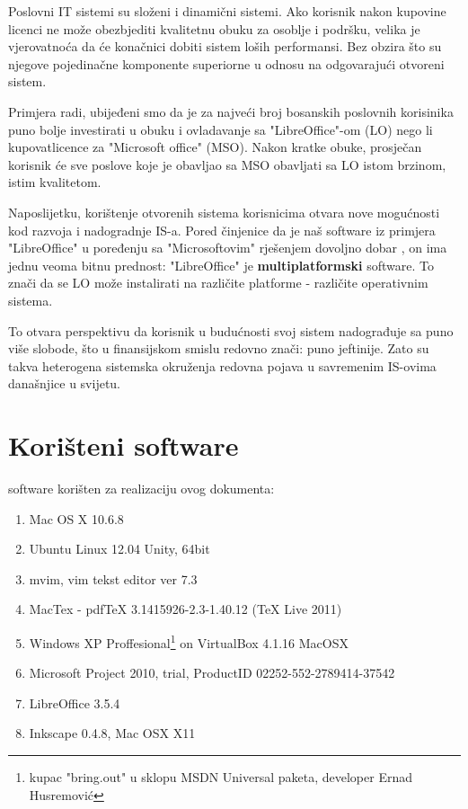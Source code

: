 \documentclass[times, utf8, seminar]{fit}
\begin{document}
Poslovni IT sistemi su složeni i dinamični sistemi. Ako korisnik nakon kupovine licenci ne može obezbjediti kvalitetnu obuku za osoblje i podršku, velika je vjerovatnoća da će konačnici dobiti sistem loših performansi. Bez obzira što su njegove pojedinačne komponente superiorne u odnosu na odgovarajući otvoreni sistem.

Primjera radi, ubijeđeni smo da je za najveći broj bosanskih poslovnih korisinika puno bolje investirati u obuku i ovladavanje sa "LibreOffice"-om (LO) nego li kupovatlicence za "Microsoft office" (MSO). Nakon kratke obuke, prosječan korisnik će sve poslove koje je obavljao sa MSO obavljati sa LO istom brzinom, istim kvalitetom.

Naposlijetku, korištenje otvorenih sistema korisnicima otvara nove mogućnosti kod razvoja i nadogradnje IS-a. 
Pored činjenice da je naš software iz primjera "LibreOffice" u poređenju sa "Microsoftovim" rješenjem dovoljno dobar , on ima jednu veoma bitnu prednost: "LibreOffice" je \textbf{multiplatformski} software. To znači da se LO može instalirati na različite platforme - različite operativnim sistema.

To otvara perspektivu da korisnik u budućnosti svoj sistem nadograđuje sa puno više slobode, što u finansijskom smislu redovno znači: puno jeftinije. Zato su takva heterogena sistemska okruženja redovna pojava u savremenim IS-ovima današnjice u svijetu.  




\appendix

\chapter{Korišteni software}
software korišten za realizaciju ovog dokumenta:
\begin{enumerate}
  \item Mac OS X 10.6.8
  \item Ubuntu Linux 12.04 Unity, 64bit
  \item mvim, vim tekst editor ver 7.3
  \item MacTex - pdfTeX 3.1415926-2.3-1.40.12 (TeX Live 2011)
  \item Windows XP Proffesional\footnote{kupac "bring.out" u sklopu MSDN Universal paketa, developer Ernad Husremović} on VirtualBox 4.1.16 MacOSX 
  \item Microsoft Project 2010, trial, ProductID 02252-552-2789414-37542
  \item LibreOffice 3.5.4
  \item Inkscape 0.4.8, Mac OSX X11
\end{enumerate}
\end{document}
